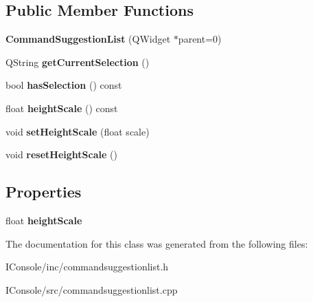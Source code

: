 \subsection*{Public Member Functions}
\begin{DoxyCompactItemize}
\item 
\hypertarget{class_command_suggestion_list_aa6cd6f32861900fb5c0280375ee45969}{{\bfseries Command\-Suggestion\-List} (Q\-Widget $\ast$parent=0)}\label{class_command_suggestion_list_aa6cd6f32861900fb5c0280375ee45969}

\item 
\hypertarget{class_command_suggestion_list_ae8f5411f7b8b3b4f86da8278951b448e}{Q\-String {\bfseries get\-Current\-Selection} ()}\label{class_command_suggestion_list_ae8f5411f7b8b3b4f86da8278951b448e}

\item 
\hypertarget{class_command_suggestion_list_afc4dc846e366ece3bf77651fd92a7392}{bool {\bfseries has\-Selection} () const }\label{class_command_suggestion_list_afc4dc846e366ece3bf77651fd92a7392}

\item 
\hypertarget{class_command_suggestion_list_a1430f35686d3572b51ebba9730083c97}{float {\bfseries height\-Scale} () const }\label{class_command_suggestion_list_a1430f35686d3572b51ebba9730083c97}

\item 
\hypertarget{class_command_suggestion_list_a5a05acbd3c0be81cb2fe7d2579cdb9a5}{void {\bfseries set\-Height\-Scale} (float scale)}\label{class_command_suggestion_list_a5a05acbd3c0be81cb2fe7d2579cdb9a5}

\item 
\hypertarget{class_command_suggestion_list_aedf54e67475b3d8e7ae116610de152a3}{void {\bfseries reset\-Height\-Scale} ()}\label{class_command_suggestion_list_aedf54e67475b3d8e7ae116610de152a3}

\end{DoxyCompactItemize}
\subsection*{Properties}
\begin{DoxyCompactItemize}
\item 
\hypertarget{class_command_suggestion_list_adb584feb5f08a036a35aa0ea1763e7b1}{float {\bfseries height\-Scale}}\label{class_command_suggestion_list_adb584feb5f08a036a35aa0ea1763e7b1}

\end{DoxyCompactItemize}


The documentation for this class was generated from the following files\-:\begin{DoxyCompactItemize}
\item 
I\-Console/inc/commandsuggestionlist.\-h\item 
I\-Console/src/commandsuggestionlist.\-cpp\end{DoxyCompactItemize}
